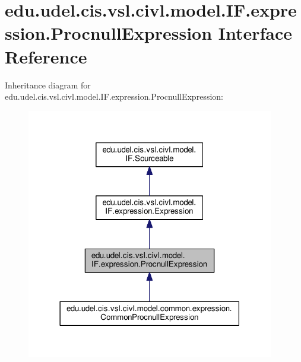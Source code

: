 \hypertarget{interfaceedu_1_1udel_1_1cis_1_1vsl_1_1civl_1_1model_1_1IF_1_1expression_1_1ProcnullExpression}{}\section{edu.\+udel.\+cis.\+vsl.\+civl.\+model.\+I\+F.\+expression.\+Procnull\+Expression Interface Reference}
\label{interfaceedu_1_1udel_1_1cis_1_1vsl_1_1civl_1_1model_1_1IF_1_1expression_1_1ProcnullExpression}


Inheritance diagram for edu.\+udel.\+cis.\+vsl.\+civl.\+model.\+I\+F.\+expression.\+Procnull\+Expression\+:
\nopagebreak
\begin{figure}[H]
\begin{center}
\leavevmode
\includegraphics[width=306pt]{interfaceedu_1_1udel_1_1cis_1_1vsl_1_1civl_1_1model_1_1IF_1_1expression_1_1ProcnullExpression__inherit__graph}
\end{center}
\end{figure}


